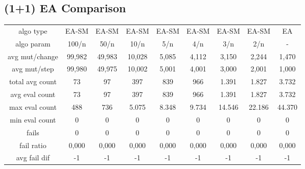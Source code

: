 \subsection{(1+1) EA Comparison}

\begin{tabular}[h]{ccccccccc}
algo type&         EA-SM&  EA-SM&  EA-SM&  EA-SM&  EA-SM&  EA-SM&  EA-SM&     EA\\
algo param&        100/n&   50/n&   10/n&    5/n&    4/n&    3/n&    2/n&      -\\
avg mut/change&   99,982& 49,983& 10,028&  5,085&  4,112&  3,150&  2,244&  1,470\\
avg mut/step&     99,980& 49,975& 10,002&  5,001&  4,001&  3,000&  2,001&  1,000\\
\hline
total avg count&      73&     97&    397&    839&    966&  1.391&  1.827&  3.732\\
avg eval count&       73&     97&    397&    839&    966&  1.391&  1.827&  3.732\\
max eval count&      488&    736&  5.075&  8.348&  9.734& 14.546& 22.186& 44.370\\
min eval count&        0&      0&      0&      0&      0&      0&      0&      0\\
\hline
fails&                 0&      0&      0&      0&      0&      0&      0&      0\\
fail ratio&        0,000&  0,000&  0,000&  0,000&  0,000&  0,000&  0,000&  0,000\\
avg fail dif&         -1&     -1&     -1&     -1&     -1&     -1&     -1&     -1\\
\end{tabular}

